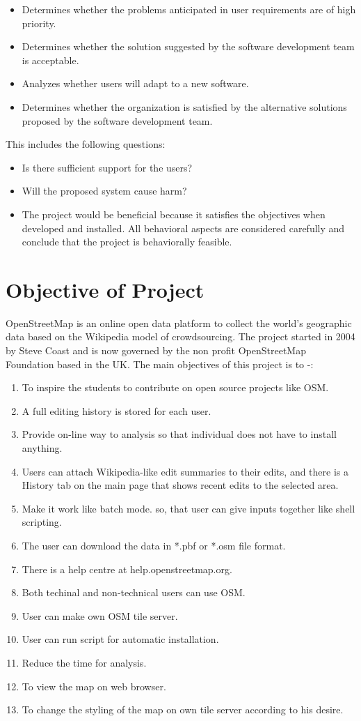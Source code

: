 \begin{itemize}
	\item Determines whether the problems anticipated in user requirements are of high priority.
	\item Determines whether the solution suggested by the software development team is acceptable.
	\item Analyzes whether users will adapt to a new software.
	\item Determines whether the organization is satisfied by the alternative solutions proposed by the software development team.
\end{itemize}

This includes the following questions:
\begin{itemize}
	\item Is there sufficient support for the users?
	\item Will the proposed system cause harm?
	\item The project would be beneficial because it satisfies the objectives when developed and installed. All behavioral aspects are considered carefully and conclude that the project is behaviorally feasible.
\end{itemize}

\section{Objective of Project }
OpenStreetMap is an online open data platform to collect the world's geographic data based on the Wikipedia model of crowdsourcing. The project started in 2004 by Steve Coast and is now governed by the non profit OpenStreetMap Foundation based in the UK. The
main objectives of this project is to -:
\begin{enumerate}
\item To inspire the students to contribute on open source projects like OSM.
\item A full editing history is stored for each user.
\item Provide on-line way to analysis so that individual does not have to
install anything.
\item Users can attach Wikipedia-like edit summaries to their edits, and there is a History tab on the main page that shows recent edits to the selected area.
\item Make it work like batch mode. so, that user can give inputs
together like shell scripting.
\item The user can download the data in *.pbf or *.osm file format.
\item There is a help centre at help.openstreetmap.org.
\item Both techinal and non-technical users can use OSM.
\item User can make own OSM tile server.
\item User can run script for automatic installation.
\item Reduce the time for analysis.
\item To view the map on web browser.
\item To change the styling of the map on own tile server according to his desire.
\end{enumerate}

